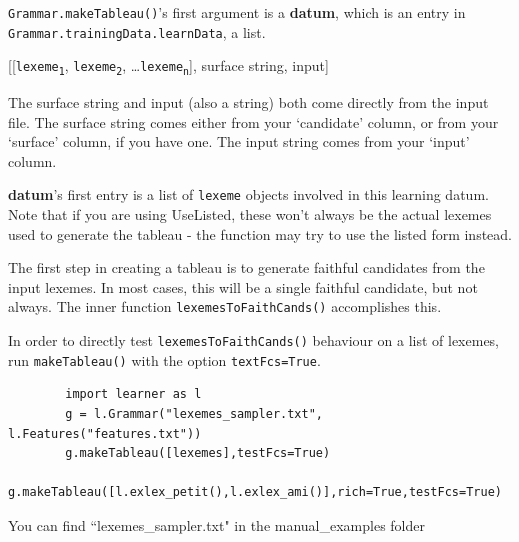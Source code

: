 \documentclass[12]{article}
\begin{document}
	\texttt{Grammar.makeTableau()}'s first argument is a {\bf datum}, which is an entry in \texttt{Grammar.trainingData.learnData}, a list.
	
	\begin{exe}
		  [[\texttt{lexeme\textsubscript{1}}, \texttt{lexeme\textsubscript{2}}, \ldots \texttt{lexeme\textsubscript{n}}], surface string, input]
	\end{exe}

	The surface string and input (also a string) both come directly from the input file.  The surface string comes either from your `candidate' column, or from your `surface' column, if you have one.  The input string comes from your `input' column.
	
	{\bf datum}'s first entry is a list of \texttt{lexeme} objects involved in this learning datum.  Note that if you are using UseListed, these won't always be the actual lexemes used to generate the tableau - the function may try to use the listed form instead.
	
	The first step in creating a tableau is to generate faithful candidates from the input lexemes.  In most cases, this will be a single faithful candidate, but not always.  The inner function \texttt{lexemesToFaithCands()} accomplishes this.
	
	In order to directly test \texttt{lexemesToFaithCands()} behaviour on a list of lexemes, run \texttt{makeTableau()} with the option \texttt{textFcs=True}.
	
	\begin{verbatim}
		import learner as l
		g = l.Grammar("lexemes_sampler.txt", l.Features("features.txt"))
		g.makeTableau([lexemes],testFcs=True)
		g.makeTableau([l.exlex_petit(),l.exlex_ami()],rich=True,testFcs=True)
	\end{verbatim}
	
	You can find ``lexemes\_sampler.txt" in the manual\_examples folder
	
	
	
\end{document}

